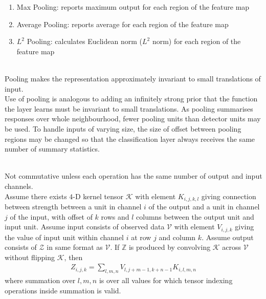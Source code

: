 \begin{example} 
\begin{enumerate}[label=\roman*.]
\setlength{\itemsep}{0pt}
\item Max Pooling: reports maximum output for each region of the feature map
\item Average Pooling: reports average for each region of the feature map
\item $L^2$ Pooling: calculates Euclidean norm ($L^2$ norm) for each region of the feature map
\end{enumerate}
\end{example}

\begin{remark} \\
Pooling makes the representation approximately invariant to small translations of input.\\
Use of pooling is analogous to adding an infinitely strong prior that the function the layer learns must be invariant to small translations. As pooling summarises responses over whole neighbourhood, fewer pooling units than detector units may be used. To handle inputs of varying size, the size of offset between pooling regions may be changed so that the classification layer always receives the same number of summary statistics.
\end{remark}

\begin{remark} \\
Not commutative unless each operation has the same number of output and input channels.\\
Assume there exists $4$-D kernel tensor $\mathcal{K}$ with element $K_{i,j,k,l}$ giving connection between strength between a unit in channel $i$ of the output and a unit in channel $j$ of the input, with offset of $k$ rows and $l$ columns between the output unit and input unit. Assume input consists of observed data $\mathcal{V}$ with element $V_{i,j,k}$ giving the value of input unit within channel $i$ at row $j$ and column $k$. Assume output consists of $\mathcal{Z}$ in same format as $\mathcal{V}$. If $\mathbb{Z}$ is produced by convolving $\mathcal{K}$ across $\mathcal{V}$ without flipping $\mathcal{K}$, then
\begin{align*}
Z_{i,j,k} = \sum\limits_{l, m, n} V_{l, j+m-1, k+n-1} K_{i,l,m,n} \nonumber
\end{align*}
where summation over $l,m,n$ is over all values for which tensor indexing operations inside summation is valid.
\end{remark}

